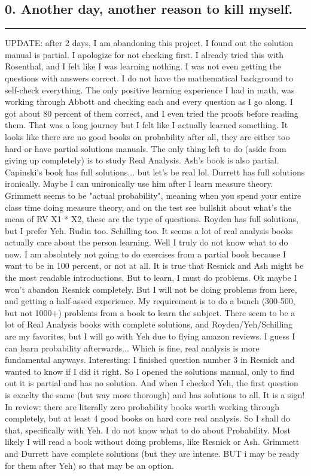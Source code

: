 \documentclass{article}
\begin{document}
\begin{flushleft}

\section*{0. Another day, another reason to kill myself.}
\bigbreak
\hrule
\bigbreak

UPDATE: after 2 days, I am abandoning this project. I found out the solution manual is partial. I apologize for not checking first. I already tried this with Rosenthal, and I felt like I was learning nothing. I was not even getting the questions with answers correct. I do not have the mathematical background to self-check everything. The only positive learning experience I had in math, was working through Abbott and checking each and every question as I go along. I got about 80 percent of them correct, and I even tried the proofs before reading them. That was a long journey but I felt like I actually learned something. It looks like there are no good books on probability after all, they are either too hard or have partial solutions manuals. The only thing left to do (aside from giving up completely) is to study Real Analysis. Ash's book is also partial. Capinski's book has full solutions... but let's be real lol. Durrett has full solutions ironically. Maybe I can unironically use him after I learn measure theory. Grimmett seems to be "actual probability", meaning when you spend your entire class time doing measure theory, and on the test see bullshit about what's the mean of RV X1 * X2, these are the type of questions. Royden has full solutions, but I prefer Yeh. Rudin too. Schilling too. It seems a lot of real analysis books actually care about the person learning. Well I truly do not know what to do now. I am absolutely not going to do exercises from a partial book because I want to be in 100 percent, or not at all. It is true that Resnick and Ash might be the most readable introductions. But to learn, I must do problems. Ok maybe I won't abandon Resnick completely. But I will not be doing problems from here, and getting a half-assed experience. My requirement is to do a bunch (300-500, but not 1000+) problems from a book to learn the subject. There seem to be a lot of Real Analysis books with complete solutions, and Royden/Yeh/Schilling are my favorites, but I will go with Yeh due to flying amazon reviews. I guess I can learn probability afterwards... Which is fine, real analysis is more fundamental anyways. Interesting: I finished question number 3 in Resnick and wanted to know if I did it right. So I opened the solutions manual, only to find out it is partial and has no solution. And when I checked Yeh, the first question is exaclty the same (but way more thorough) and has solutions to all. It is a sign! In review: there are literally zero probability books worth working through completely, but at least 4 good books on hard core real analysis. So I shall do that, specifically with Yeh. I do not know what to do about Probability. Most likely I will read a book without doing problems, like Resnick or Ash. Grimmett and Durrett have complete solutions (but they are intense. BUT i may be ready for them after Yeh) so that may be an option. 


\end{flushleft}
\end{document}
